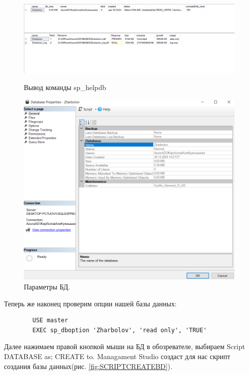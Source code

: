 \begin{figure}[h!]
    \begin{minipage}[p]{0.45\linewidth}
        \centering
        \includegraphics[width=1\linewidth]{Pic/lab1/HELP_DB.PNG}
        \caption{Вывод команды sp\_helpdb}
        \label{fig:enter-label}
    \end{minipage}
    \hfill
    \begin{minipage}[p]{0.45\linewidth}
        \centering
        \includegraphics[width=0.45\linewidth]{Pic/lab1/DataBaseProperties.PNG}
        \caption{Параметры БД.}
        \label{fig:PROPDATABASE}
    \end{minipage}
    
\end{figure}

Теперь же наконец проверим опции нашей базы данных: 

\begin{verbatim}
        USE master
        EXEC sp_dboption 'Zharbolov', 'read only', 'TRUE'
\end{verbatim}

Далее нажимаем правой кнопкой мыши на БД в обозревателе, выбираем Script DATABASE as; CREATE to. Managament Studio создаст для нас скрипт создания базы данных(рис. \ref{fig:SCRIPTCREATEBD}).

